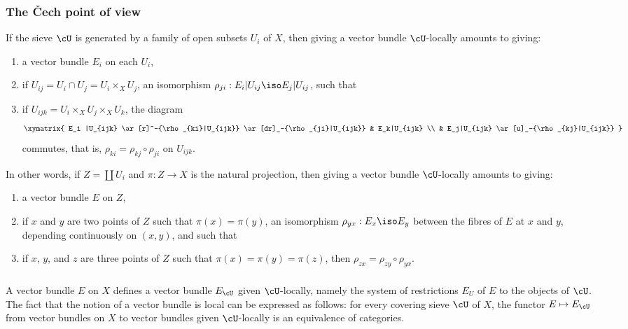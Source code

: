 \subsubsection{The Čech point of view}\label{I:1-3-2}

If the sieve $\cU$ is generated by a family of open subsets $U_i$ of
$X$, then giving a vector bundle $\cU$-locally amounts to giving:
\begin{enumerate}[\indent a)]
  \item a vector bundle $E_i$ on each $U_i$,
  \item if $U_{ij}=U_i\cap U_j=U_i\times_X U_j$, an isomorphism
    $\rho_{ji}:E_i|U_{ij}\iso E_j|U_{ij}$, such that
  \item if $U_{ijk}=U_i\times_X U_j\times_X U_k$, the diagram
    \[\xymatrix{
      E_i |U_{ijk} \ar[r]^-{\rho_{ki}|U_{ijk}} \ar[dr]_-{\rho_{ji}|U_{ijk}}
        & E_k|U_{ijk} \\
      & E_j|U_{ijk} \ar[u]_-{\rho_{kj}|U_{ijk}}
    }\]
    commutes, that is, $\rho_{ki}=\rho_{kj}\circ\rho_{ji}$ on
    $U_{ijk}$.
\end{enumerate}

In other words, if $Z=\coprod U_i$ and $\pi:Z\to X$ is the natural
projection, then giving a vector bundle $\cU$-locally amounts to giving:
\begin{enumerate}[\indent a)]
  \item a vector bundle $E$ on $Z$,
  \item if $x$ and $y$ are two points of $Z$ such that
    $\pi(x)=\pi(y)$, an isomorphism $\rho_{yx}:E_x\iso E_y$ between the
    fibres of $E$ at $x$ and $y$, depending continuously on $(x,y)$,
    and such that
  \item if $x$, $y$, and $z$ are three points of $Z$ such that
    $\pi(x)=\pi(y)=\pi(z)$, then
    $\rho_{zx}=\rho_{zy}\circ\rho_{yx}$.
\end{enumerate}

\subsubsection{}\label{I:1-3-3}

A vector bundle $E$ on $X$ defines a vector bundle $E_\cU$ given
$\cU$-locally, namely the system of restrictions $E_U$ of $E$ to the
objects of $\cU$. The fact that the notion of a vector bundle is local can
be expressed as follows: for every covering sieve $\cU$ of $X$, the
functor $E\mapsto E_\cU$ from vector bundles on $X$ to vector bundles
given $\cU$-locally is an equivalence of categories.


